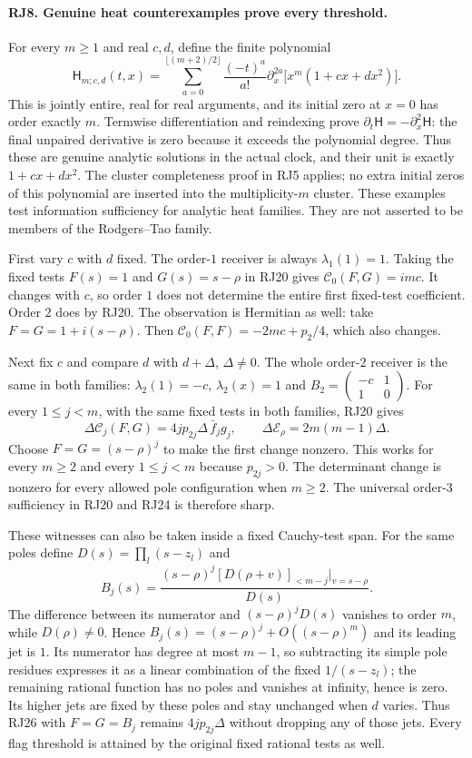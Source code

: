 \documentclass[11pt,a4paper]{article}
\theoremstyle{definition}\newtheorem{definition}[theorem]{Definition}
\begin{document}
\paragraph{RJ8. Genuine heat counterexamples prove every threshold.}
For every $m\ge1$ and real $c,d$, define the finite polynomial
\[
 \mathsf H_{m;c,d}(t,x)=
 \sum_{a=0}^{\lfloor(m+2)/2\rfloor}
   \frac{(-t)^a}{a!}\partial_x^{2a}
                  \bigl[x^m(1+cx+dx^2)\bigr].
 \tag{RJ25}
\]
This is jointly entire, real for real arguments, and its initial
zero at $x=0$ has order exactly $m$. Termwise differentiation
and reindexing prove $\partial_t\mathsf H=-\partial_x^2\mathsf H$:
the final unpaired derivative is zero because it exceeds the
polynomial degree. Thus these are genuine analytic solutions in
the actual clock, and their unit is exactly $1+cx+dx^2$.
The cluster completeness proof in RJ5 applies; no extra initial
zeros of this polynomial are inserted into the multiplicity-$m$
cluster. These examples test information sufficiency for analytic
heat families. They are not asserted to be members of the
Rodgers--Tao family.

First vary $c$ with $d$ fixed. The order-$1$ receiver is always
$\lambda_1(1)=1$. Taking the fixed tests $F(s)=1$ and
$G(s)=s-\rho$ in RJ20 gives $\mathcal C_0(F,G)=imc$.
It changes with $c$, so order $1$ does not determine the entire
first fixed-test coefficient. Order $2$ does by RJ20. The
observation is Hermitian as well: take $F=G=1+i(s-\rho)$.
Then $\mathcal C_0(F,F)=-2mc+p_2/4$, which also changes.

Next fix $c$ and compare $d$ with $d+\Delta$, $\Delta\ne0$.
The whole order-$2$ receiver is the same in both families:
$\lambda_2(1)=-c$, $\lambda_2(x)=1$ and
$B_2=\left(\begin{smallmatrix}-c&1\\1&0\end{smallmatrix}\right)$.
For every $1\le j<m$, with the same fixed tests in both families,
RJ20 gives
\[
 \boxed{\Delta\mathcal C_j(F,G)=
              4j p_{2j}\Delta\,\bar f_jg_j,\qquad
       \Delta\mathcal E_\rho=2m(m-1)\Delta.}
 \tag{RJ26}
\]
Choose $F=G=(s-\rho)^j$ to make the first change nonzero.
This works for every $m\ge2$ and every $1\le j<m$ because
$p_{2j}>0$. The determinant change is nonzero for every allowed
pole configuration when $m\ge2$. The universal order-$3$
sufficiency in RJ20 and RJ24 is therefore sharp.

These witnesses can also be taken inside a fixed Cauchy-test
span. For the same poles define $D(s)=\prod_l(s-z_l)$ and
\[
 B_j(s)=\frac{(s-\rho)^j
                [D(\rho+v)]_{<m-j}|_{v=s-\rho}}{D(s)}.
 \tag{RJ27}
\]
The difference between its numerator and $(s-\rho)^jD(s)$
vanishes to order $m$, while $D(\rho)\ne0$. Hence
$B_j(s)=(s-\rho)^j+O((s-\rho)^m)$ and its leading jet is $1$.
Its numerator has degree at most $m-1$, so subtracting its simple
pole residues expresses it as a linear combination of the fixed
$1/(s-z_l)$; the remaining rational function has no poles and
vanishes at infinity, hence is zero. Its higher jets are fixed
by these poles and stay unchanged when $d$ varies. Thus RJ26
with $F=G=B_j$ remains $4j p_{2j}\Delta$ without dropping any
of those jets. Every flag threshold is attained by the original
fixed rational tests as well.
\end{document}
